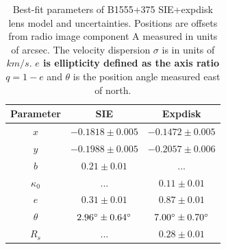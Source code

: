 \documentclass[useAMS,usenatbib]{mn2e}
\begin{document}
\begin{table}
 \centering
  \caption{Best-fit parameters of B1555+375 SIE+expdisk lens model and uncertainties. Positions are offsets from radio image component A measured in units of arcsec. The velocity dispersion $\sigma$ is in units of $km/s$. \textbf{$e$ is ellipticity defined as the axis ratio $q=1-e$ }and $\theta$ is the position angle measured east of north.}
  \begin{tabular}{@{}ccc}
\hline 
 Parameter  & SIE & Expdisk 		   
\\
\hline
$x$  	  & $-0.1818 \pm 0.005$	&$-0.1472 \pm 0.005$ 	  \\
$y$	  &$-0.1988 \pm 0.005$	&$-0.2057 \pm 0.006$	 \\

$b$ &$0.21 \pm 0.01$  & ...   \\
$\kappa_0$ & ... & $0.11 \pm 0.01$        \\  
$e$	  & $0.31\pm 0.01$	&$0.87 \pm 0.01$ \\
$\theta$ &$2.96 \hbox{$^\circ$} \pm 0.64 \hbox{$^\circ$}$ &$7.00\hbox{$^\circ$} \pm 0.70 \hbox{$^\circ$}$ \\
$R_s$	& ...  & $0.28 \pm 0.01$\\
\hline
\end{tabular}

\end{table}


\end{document}
